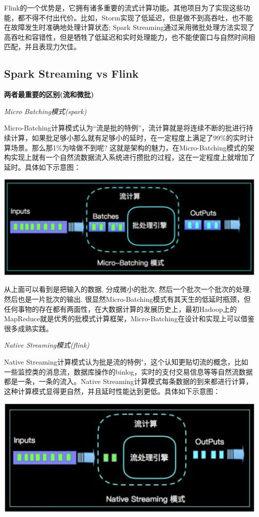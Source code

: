 \documentclass[oneside]{ctexbook}
\begin{document}
Flink的一个优势是，它拥有诸多重要的流式计算功能。其他项目为了实现这些功能，都不得不付出代价。比如，Storm实现了低延迟，但是做不到高吞吐，也不能在故障发生时准确地处理计算状态; Spark Streaming通过采用微批处理方法实现了高吞吐和容错性，但是牺牲了低延迟和实时处理能力，也不能使窗口与自然时间相匹配，并且表现力欠佳。

\subsection{Spark Streaming vs Flink}

\textbf{两者最重要的区别(流和微批)}

\textit{Micro Batching模式(spark)}

Micro-Batching计算模式认为“流是批的特例”，流计算就是将连续不断的批进行持续计算，如果批足够小那么就有足够小的延时，在一定程度上满足了99\%的实时计算场景。那么那1\%为啥做不到呢? 这就是架构的魅力，在Micro-Batching模式的架构实现上就有一个自然流数据流入系统进行攒批的过程，这在一定程度上就增加了延时。具体如下示意图：

\noindent \includegraphics[width=\linewidth]{sparkstreamingvsflink1.png}

从上面可以看到是把输入的数据, 分成微小的批次, 然后一个批次一个批次的处理, 然后也是一片批次的输出. 很显然Micro-Batching模式有其天生的低延时瓶颈，但任何事物的存在都有两面性，在大数据计算的发展历史上，最初Hadoop上的MapReduce就是优秀的批模式计算框架，Micro-Batching在设计和实现上可以借鉴很多成熟实践。

\textit{Native Streaming模式(flink)}

Native Streaming计算模式认为批是流的特例"，这个认知更贴切流的概念，比如一些监控类的消息流，数据库操作的binlog，实时的支付交易信息等等自然流数据都是一条，一条的流入。Native Streaming计算模式每条数据的到来都进行计算，这种计算模式显得更自然，并且延时性能达到更低。具体如下示意图：

\noindent \includegraphics[width=\textwidth]{sparkstreamingvsflink2.png}
\end{document}
